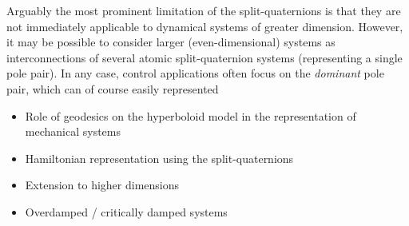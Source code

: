 Arguably the most prominent limitation of the split-quaternions is that they are not immediately applicable to dynamical systems of greater dimension. However, it may be possible to consider larger (even-dimensional) systems as interconnections of several atomic split-quaternion systems (representing a single pole pair). In any case, control applications often focus on the \emph{dominant} pole pair, which can of course easily represented 

\begin{itemize}
    \item Role of geodesics on the hyperboloid model in the representation of mechanical systems
    \item Hamiltonian representation using the split-quaternions
    \item Extension to higher dimensions
    \item Overdamped / critically damped systems
\end{itemize}


